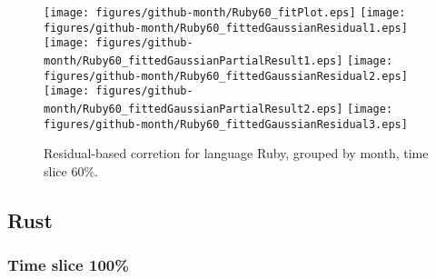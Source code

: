 \begin{figure}[hb]
\centering
{}
{\texttt{[image: figures/github-month/Ruby60\_fitPlot.eps]}}
{\texttt{[image: figures/github-month/Ruby60\_fittedGaussianResidual1.eps]}}
{\texttt{[image: figures/github-month/Ruby60\_fittedGaussianPartialResult1.eps]}}
{\texttt{[image: figures/github-month/Ruby60\_fittedGaussianResidual2.eps]}}
{\texttt{[image: figures/github-month/Ruby60\_fittedGaussianPartialResult2.eps]}}
{\texttt{[image: figures/github-month/Ruby60\_fittedGaussianResidual3.eps]}}
\caption{Residual-based corretion for language Ruby, grouped by month, time slice 60\%.}
\end{figure}


\clearpage 
\newpage 


\subsection{Rust}

\FloatBarrier

\subsubsection{Time slice 100\%}

